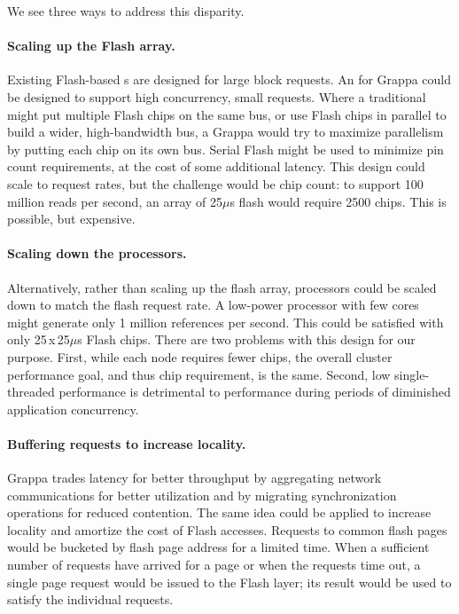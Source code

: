We see three ways to address this disparity.

\paragraph{Scaling up the Flash array.}
Existing Flash-based \hspace{0.75pt}s are designed for large block requests. An
 for Grappa could be designed to support high concurrency, small
requests. Where a traditional  might put multiple Flash chips on
the same bus, or use Flash chips in parallel to build a wider,
high-bandwidth bus, a Grappa  would try to maximize parallelism by
putting each chip on its own bus. Serial Flash might be used to
minimize pin count requirements, at the cost of some additional
latency. This design could scale to request rates, but the challenge
would be chip count: to support 100 million reads per second, an array of
25$\mu$s flash would require 2500 chips. This is possible, but expensive.

\paragraph{Scaling down the processors.}
Alternatively, rather than scaling up the flash array, processors
could be scaled down to match the flash request rate. A low-power
processor with few cores might generate only 1 million references per
second. This could be satisfied with only 25\,x\,25$\mu$s Flash chips.
There are two problems with this design for our purpose. First, while each node
requires fewer chips, the overall cluster performance goal, and thus
chip requirement, is the same. Second, low single-threaded performance is detrimental to performance during periods of diminished application concurrency.

\paragraph{Buffering requests to increase locality.}
Grappa trades latency for better throughput by aggregating network
communications for better utilization and by migrating synchronization
operations for reduced contention. The same idea could be applied to
increase locality and amortize the cost of Flash accesses. Requests
to common flash pages would be bucketed by flash page address for a
limited time. When a sufficient number of requests have arrived for a page
or when the requests time out, a single page request would be issued to the Flash
layer; its result would be used to satisfy the individual requests.

